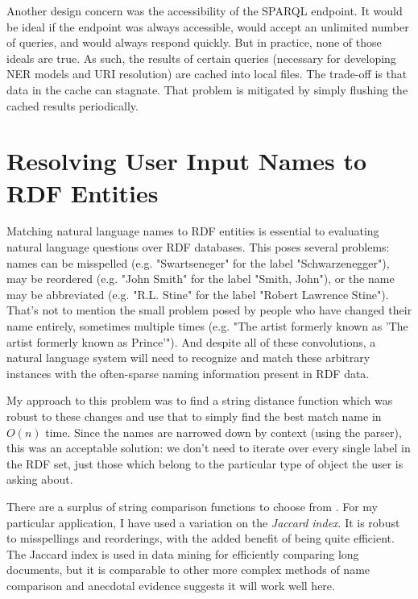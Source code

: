 \documentclass[11pt]{article}
\begin{document}
Another design concern was the accessibility of the SPARQL endpoint.
It would be ideal if the endpoint was always accessible, would accept an unlimited
number of queries, and would always respond quickly. But in practice, none of
those ideals are true. As such, the results of certain queries
(necessary for developing NER models and URI resolution) are cached into local files.
The trade-off is that data in the cache can stagnate. That problem is mitigated by 
simply flushing the cached results periodically.


\section{Resolving User Input Names to RDF Entities}

Matching natural language names to RDF entities is essential to evaluating
natural language questions over RDF databases. This poses several problems:
names can be misspelled (e.g. "Swartseneger" for the label "Schwarzenegger"), 
may be reordered (e.g. "John Smith" for the label "Smith, John"),
or the name may be abbreviated (e.g. "R.L. Stine" for the label "Robert Lawrence Stine").
That's not to mention the small problem posed by people who have
changed their name entirely, sometimes multiple times
(e.g. "The artist formerly known as 'The artist formerly known as Prince'").
And despite all of these convolutions, a natural language system will need to
recognize and match these arbitrary instances with the often-sparse naming information
present in RDF data.

My approach to this problem was to find a string distance function which was
robust to these changes and use that to simply
find the best match name in $O(n)$ time. Since the names are narrowed down by
context (using the parser), this was an acceptable solution: we don't need to iterate
over every single label in the RDF set, just those which belong to the particular
type of object the user is asking about.

There are a surplus of string comparison functions to choose from \cite{comparison}.
For my particular application, I have used a variation on the {\em Jaccard index}.
It is robust to misspellings and reorderings, with the added benefit of being quite efficient.
The Jaccard index is used in data mining for efficiently comparing long documents,
but it is comparable to other more complex methods of name comparison \cite{comparison} and 
anecdotal evidence suggests it will work well here.
\end{document}
